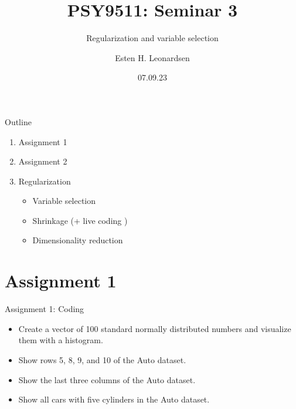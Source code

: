 \documentclass[8pt]{beamer}
\title{PSY9511: Seminar 3}
\subtitle{Regularization and variable selection}
\author{Esten H. Leonardsen}
\date{07.09.23}
\begin{document}
	\begin{frame}
	 	\maketitle
	\end{frame}

    \begin{frame}{Outline}
        \centering
        \vfill
        \begin{enumerate}
            \item Assignment 1
            \item Assignment 2
            \item Regularization
            \begin{itemize}
                \item Variable selection
                \item Shrinkage (+ live coding )
                \item Dimensionality reduction
            \end{itemize}
        \end{enumerate}
        \vfill
    \end{frame}

    \section{Assignment 1}

    \begin{frame}[t]{Assignment 1: Coding}
        \vspace{2cm}
        \begin{itemize}
            \item Create a vector of 100 standard normally distributed numbers and visualize them with a histogram.
            \item Show rows 5, 8, 9, and 10 of the Auto dataset.
            \item Show the last three columns of the Auto dataset.
            \item Show all cars with five cylinders in the Auto dataset.
        \end{itemize}

    \end{frame}
\end{document}
